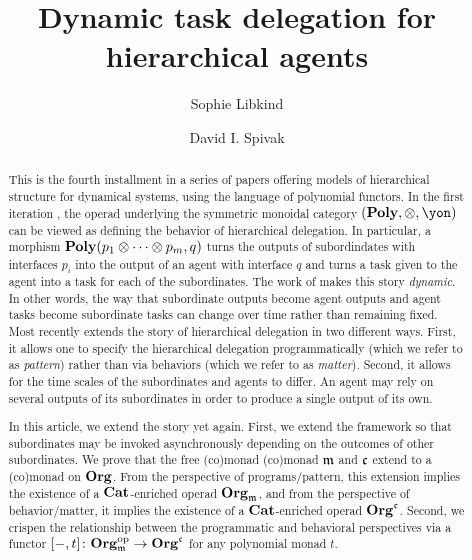\documentclass[11pt, one side, article]{memoir}
\begin{document}
\title{Dynamic task delegation for hierarchical agents}

\author{
	Sophie Libkind\and
	David I. Spivak
}


\maketitle

\begin{abstract}
This is the fourth installment in a series of papers offering models of hierarchical structure for dynamical systems, using the language of polynomial functors. In the first iteration  \cite{niu2022poly}, the operad underlying the symmetric monoidal category $(\poly, \otimes, \yon)$ can be viewed as defining the behavior of hierarchical delegation. In particular, a morphism $\mathbf{Poly}(p_1 \otimes \cdots \otimes p_m, q)$ turns the outputs of subordindates with interfaces $p_i$ into the output of an agent with interface $q$ and turns a task given to the agent into a task for each of the subordinates. The work of \cite{shapiro2022dynamic} makes this story \emph{dynamic}. In other words, the way that subordinate outputs become agent outputs and agent tasks become subordinate tasks can change over time rather than remaining fixed. Most recently \cite{libkind2024pattern}  extends the story of hierarchical delegation in two different ways. First, it allows one to specify the hierarchical delegation programmatically (which we refer to as \emph{pattern}) rather than via behaviors (which we refer to as \emph{matter}).  Second, it allows for the time scales of the subordinates and agents to differ. An agent may rely on several outputs of its subordinates in order to produce a single output of its own.

In this article, we extend the story yet again. First, we extend the framework so that subordinates may be invoked asynchronously depending on the outcomes of other subordinates. We prove that the free (co)monad (co)monad $\mathfrak{m}$ and $\mathfrak{c}$ extend to a (co)monad on $\mathbf{Org}$. From the perspective of programs/pattern, this extension implies the existence of a $\mathbf{Cat}$-enriched operad $\mathbf{Org}_{\mathfrak{m}}$, and from the perspective of behavior/matter, it implies the existence of a $\mathbf{Cat}$-enriched operad $\mathbf{Org}^{\mathfrak{c}}$.  Second, we crispen the relationship between the programmatic and behavioral perspectives via a functor $[-, t] \colon \mathbf{Org}_{\mathfrak{m}}^{\textnormal{op}} \to \mathbf{Org}^{\mathfrak{c}}$ for any polynomial monad $t$.

\end{abstract}
\end{document}

